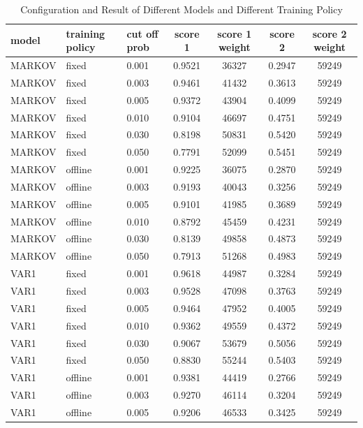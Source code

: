 \documentclass{article}
\begin{document}
\begin{longtable}[htbp]{l|l|l|*{4}{c}}
    \caption{Configuration and Result of Different Models and Different Training Policy}
    \label{tab:tab1.5.3} \\
    \textbf{model} & \textbf{training policy} & \textbf{cut off prob} & \textbf{score 1} & \textbf{score 1 weight} & \textbf{score 2} & \textbf{score 2 weight} \\
    \hline
    MARKOV & fixed & 0.001 & 0.9521 & 36327 & 0.2947 & 59249\\
    MARKOV & fixed & 0.003 & 0.9461 & 41432 & 0.3613 & 59249\\
    MARKOV & fixed & 0.005 & 0.9372 & 43904 & 0.4099 & 59249\\
    MARKOV & fixed & 0.010 & 0.9104 & 46697 & 0.4751 & 59249\\
    MARKOV & fixed & 0.030 & 0.8198 & 50831 & 0.5420 & 59249\\
    MARKOV & fixed & 0.050 & 0.7791 & 52099 & 0.5451 & 59249\\
    MARKOV & offline & 0.001 & 0.9225 & 36075 & 0.2870 & 59249\\
    MARKOV & offline & 0.003 & 0.9193 & 40043 & 0.3256 & 59249\\
    MARKOV & offline & 0.005 & 0.9101 & 41985 & 0.3689 & 59249\\
    MARKOV & offline & 0.010 & 0.8792 & 45459 & 0.4231 & 59249\\
    MARKOV & offline & 0.030 & 0.8139 & 49858 & 0.4873 & 59249\\
    MARKOV & offline & 0.050 & 0.7913 & 51268 & 0.4983 & 59249\\
    VAR1 & fixed & 0.001 & 0.9618 & 44987 & 0.3284 & 59249\\
    VAR1 & fixed & 0.003 & 0.9528 & 47098 & 0.3763 & 59249\\
    VAR1 & fixed & 0.005 & 0.9464 & 47952 & 0.4005 & 59249\\
    VAR1 & fixed & 0.010 & 0.9362 & 49559 & 0.4372 & 59249\\
    VAR1 & fixed & 0.030 & 0.9067 & 53679 & 0.5056 & 59249\\
    VAR1 & fixed & 0.050 & 0.8830 & 55244 & 0.5403 & 59249\\
    VAR1 & offline & 0.001 & 0.9381 & 44419 & 0.2766 & 59249\\
    VAR1 & offline & 0.003 & 0.9270 & 46114 & 0.3204 & 59249\\
    VAR1 & offline & 0.005 & 0.9206 & 46533 & 0.3425 & 59249\\

\end{longtable}
\end{document}
